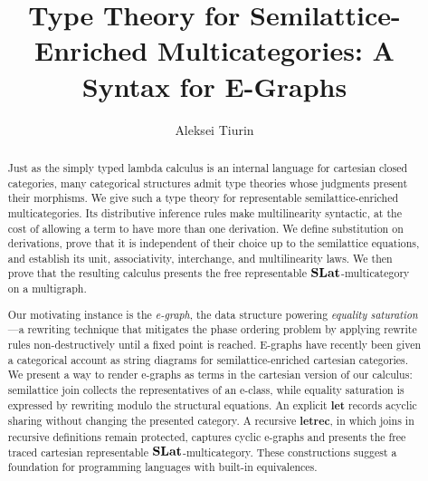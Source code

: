 \documentclass[a4paper,UKenglish,cleveref, autoref, thm-restate, anonymous]{lipics-v2021}
\title{Type Theory for Semilattice-Enriched Multicategories: A Syntax for E-Graphs}
\author{Aleksei Tiurin}{University of Birmingham, UK}{}{}{}
\begin{document}
\maketitle

\begin{abstract}
Just as the simply typed lambda calculus is an internal language for cartesian
closed categories, many categorical structures admit type theories whose
judgments present their morphisms. We give such a type theory for representable
semilattice-enriched multicategories. Its distributive inference rules make
multilinearity syntactic, at the cost of allowing a term to have more than one
derivation. We define substitution on derivations, prove that it is independent
of their choice up to the semilattice equations, and establish its unit,
associativity, interchange, and multilinearity laws. We then prove that the
resulting calculus presents the free representable
$\mathbf{SLat}$-multicategory on a multigraph.

Our motivating instance is the \emph{e-graph}, the data structure powering
\emph{equality saturation}---a rewriting technique that mitigates the phase
ordering problem by applying rewrite rules non-destructively until a fixed point
is reached. E-graphs have recently been given a categorical account as string
diagrams for semilattice-enriched cartesian categories. We present a way to
render e-graphs as terms in the cartesian version of our calculus: semilattice
join collects the representatives of an e-class, while equality saturation is
expressed by rewriting modulo the structural equations. An explicit
\textbf{let} records acyclic sharing without changing the presented category.
A recursive \textbf{letrec}, in which joins in recursive definitions remain
protected, captures cyclic e-graphs and presents the free traced cartesian
representable $\mathbf{SLat}$-multicategory. These constructions suggest a
foundation for programming languages with built-in equivalences.
\end{abstract}






\label{mark:refs}


\appendix
{}\label{mark:appendix}



\end{document}
